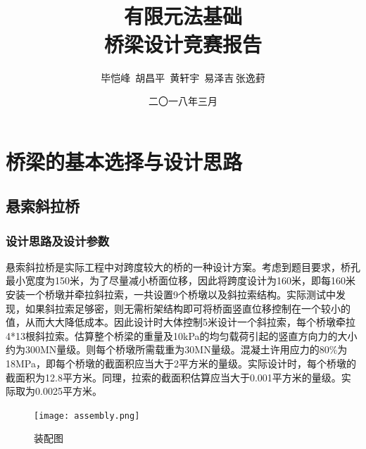 \documentclass[forprint]{WHUBachelor}
\begin{document}



\title{\\有限元法基础\\桥梁设计竞赛报告}


\author{毕恺峰$\,$ 胡昌平$\,$ 黄轩宇 $\,$易泽吉$\,$张逸葑}                            %



\date{二〇一八年三月}                    %


\maketitle
\frontmatter
{}              %


\mainmatter %
\tableofcontents

\chapter{桥梁的基本选择与设计思路}
\section{悬索斜拉桥}
\subsection{设计思路及设计参数}
悬索斜拉桥是实际工程中对跨度较大的桥的一种设计方案。考虑到题目要求，桥孔最小宽度为150米，为了尽量减小桥面位移，因此将跨度设计为160米，即每160米安装一个桥墩并牵拉斜拉索，一共设置9个桥墩以及斜拉索结构。实际测试中发现，如果斜拉索足够密，则无需桁架结构即可将桥面竖直位移控制在一个较小的值，从而大大降低成本。因此设计时大体控制5米设计一个斜拉索，每个桥墩牵拉4*13根斜拉索。估算整个桥梁的重量及10kPa的均匀载荷引起的竖直方向力的大小约为300MN量级。则每个桥墩所需载重为30MN量级。混凝土许用应力的80\%为18MPa，即每个桥墩的截面积应当大于2平方米的量级。实际设计时，每个桥墩的截面积为12.8平方米。同理，拉索的截面积估算应当大于0.001平方米的量级。实际取为0.0025平方米。
\begin{figure}[H]
\centering  
\texttt{[image: assembly.png]} 
\caption{装配图} 
\label{3-1} 
\end{figure}
\end{document}
